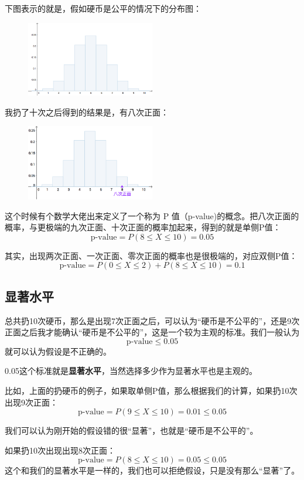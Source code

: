 \documentclass[12pt]{article}
\begin{document}
下图表示的就是，假如硬币是公平的情况下的分布图：
\begin{figure}[H]
    \centering
    \includegraphics[width=0.5\textwidth]{fig/P_Value_Example_1.png}
\end{figure}
我扔了十次之后得到的结果是，有八次正面：
\begin{figure}[H]
    \centering
    \includegraphics[width=0.5\textwidth]{fig/P_Value_Example_2.png}
\end{figure}

这个时候有个数学大佬出来定义了一个称为 P 值（p-value)的概念。把八次正面的概率，与更极端的九次正面、十次正面的概率加起来，得到的就是单侧P值：
$$
\text{p-value} = P(8 \le X \le 10) = 0.05
$$

其实，出现两次正面、一次正面、零次正面的概率也是很极端的，对应双侧P值：
$$
\text{p-value} = P(0 \le X \le 2)  +  P(8 \le X \le 10) = 0.1
$$

\subsection{显著水平}
总共扔10次硬币，那么是出现7次正面之后，可以认为“硬币是不公平的”，还是9次正面之后我才能确认“硬币是不公平的”，这是一个较为主观的标准。我们一般认为
$$
\text{p-value} \le 0.05
$$
就可以认为假设是不正确的。

0.05这个标准就是\textbf{显著水平}，当然选择多少作为显著水平也是主观的。

比如，上面的扔硬币的例子，如果取单侧P值，那么根据我们的计算，如果扔10次出现9次正面：
$$
\text{p-value} = P(9 \le X \le 10) = 0.01 \le 0.05
$$

我们可以认为刚开始的假设错的很“显著”，也就是“硬币是不公平的”。

如果扔10次出现出现8次正面：
$$
\text{p-value} = P(8 \le X \le 10) = 0.05 \le 0.05
$$
这个和我们的显著水平是一样的，我们也可以拒绝假设，只是没有那么“显著”了。
\end{document}
